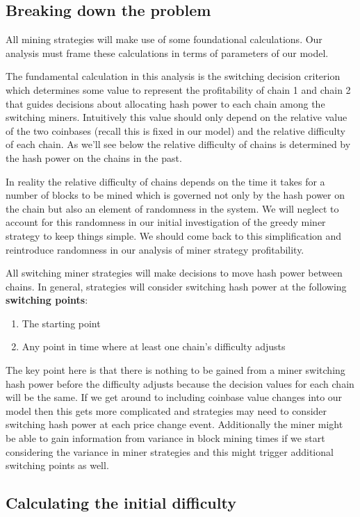 \documentclass[12pt]{article}
\begin{document}
\subsection*{Breaking down the problem}
All mining strategies will make use of some foundational calculations. Our analysis must frame these calculations in terms of parameters of our model.

The fundamental calculation in this analysis is the switching decision criterion which determines some value to represent the profitability of chain 1 and chain 2 that guides decisions about allocating hash power to each chain among the switching miners.  Intuitively this value should only depend on the relative value of the two coinbases (recall this is fixed in our model) and the relative difficulty of each chain.  As we'll see below the relative difficulty of chains is determined by the hash power on the chains in the past.

In reality the relative difficulty of chains depends on the time it takes for a number of blocks to be mined which is governed not only by the hash power on the chain but also an element of randomness in the system.  We will neglect to account for this randomness in our initial investigation of the greedy miner strategy to keep things simple.  We should come back to this simplification and reintroduce randomness in our analysis of miner strategy profitability. 

All switching miner strategies will make decisions to move hash power between chains.  In general, strategies will consider switching hash power at the following \textbf{switching points}:
\begin{enumerate}
\item
The starting point
\item
Any point in time where at least one chain's difficulty adjusts
\end{enumerate}
The key point here is that there is nothing to be gained from a miner switching hash power before the difficulty adjusts because the decision values for each chain will be the same.  If we get around to including coinbase value changes into our model then this gets more complicated and strategies may need to consider switching hash power at each price change event.  Additionally the miner might be able to gain information from variance in block mining times if we start considering the variance in miner strategies and this might trigger additional switching points as well.

\subsection*{Calculating the initial difficulty}
\end{document}
